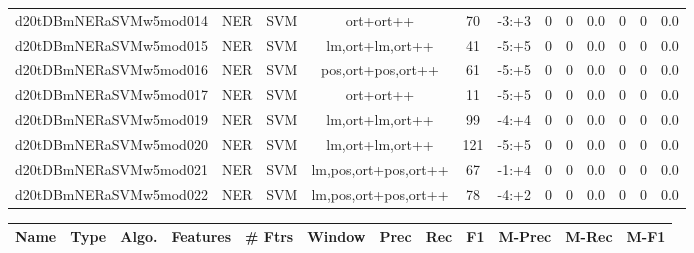 \documentclass[a4paper]{article}
\begin{document}
\begin{landscape}
\begin{center}
\begin{tabular}{ |c|c|c|c|c|c|c|c|c|c|c|c|}
 
 	
 	\small{ d20tDBmNERaSVMw5mod014 } & \small{ NER} & \small{  SVM }  & ort+ort++  &  70 &  \small{  -3:+3 }  &  0 & 0 & 0.0  &  0 & 0 & 0.0 \\
 	

 
 	
 	\small{ d20tDBmNERaSVMw5mod015 } & \small{ NER} & \small{  SVM }  & lm,ort+lm,ort++  &  41 &  \small{  -5:+5 }  &  0 & 0 & 0.0  &  0 & 0 & 0.0 \\
 	

 
 	
 	\small{ d20tDBmNERaSVMw5mod016 } & \small{ NER} & \small{  SVM }  & pos,ort+pos,ort++  &  61 &  \small{  -5:+5 }  &  0 & 0 & 0.0  &  0 & 0 & 0.0 \\
 	

 
 	
 	\small{ d20tDBmNERaSVMw5mod017 } & \small{ NER} & \small{  SVM }  & ort+ort++  &  11 &  \small{  -5:+5 }  &  0 & 0 & 0.0  &  0 & 0 & 0.0 \\
 	

 
 	
 	\small{ d20tDBmNERaSVMw5mod019 } & \small{ NER} & \small{  SVM }  & lm,ort+lm,ort++  &  99 &  \small{  -4:+4 }  &  0 & 0 & 0.0  &  0 & 0 & 0.0 \\
 	

 
 	
 	\small{ d20tDBmNERaSVMw5mod020 } & \small{ NER} & \small{  SVM }  & lm,ort+lm,ort++  &  121 &  \small{  -5:+5 }  &  0 & 0 & 0.0  &  0 & 0 & 0.0 \\
 	

 
 	
 	\small{ d20tDBmNERaSVMw5mod021 } & \small{ NER} & \small{  SVM }  & lm,pos,ort+pos,ort++  &  67 &  \small{  -1:+4 }  &  0 & 0 & 0.0  &  0 & 0 & 0.0 \\
 	

 
 	
 	\small{ d20tDBmNERaSVMw5mod022 } & \small{ NER} & \small{  SVM }  & lm,pos,ort+pos,ort++  &  78 &  \small{  -4:+2 }  &  0 & 0 & 0.0  &  0 & 0 & 0.0 \\
 	
 \hline
\end{tabular}
\end{center}




\begin{center}
\begin{tabular}{ |c|c|c|c|c|c|c|c|c|c|c|c|} 
 \hline
 	Name & Type & Algo. & Features & \# Ftrs & Window & Prec & Rec & F1 & M-Prec & M-Rec & M-F1\\
 \hline


\end{tabular}
\end{center}
\end{landscape}
\end{document}
